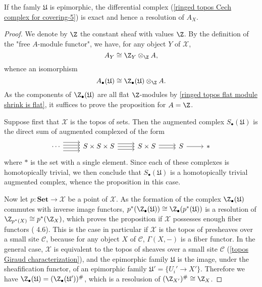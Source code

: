 \begin{proposition}\label{ringed topos Cech complex resolution for epimorphic}
If the famly $\mathfrak{U}$ is epimorphic, the differential complex (\ref{ringed topos Cech complex for covering-5}) is exact and hence a resolution of $A_X$.
\end{proposition}
\begin{proof}
We denote by $\Z$ the constant sheaf with values $\Z$. By the definition of the "free $A$-module functor", we have, for any object $Y$ of $\mathcal{X}$,
\[A_Y\cong\Z_Y\otimes_\Z A,\]
whence an isomorphism
\[A_\bullet(\mathfrak{U})\cong\Z_\bullet(\mathfrak{U})\otimes_\Z A.\]
As the components of $\Z_\bullet(\mathfrak{U})$ are all flat $\Z$-modules by \cref{ringed topos flat module shrink is flat}, it suffices to prove the proposition for $A=\Z$.\par
Suppose first that $\mathcal{X}$ is the topos of sets. Then the augmented complex $S_\bullet(\mathfrak{U})$ is the direct sum of augmented complexed of the form
\[\begin{tikzcd}
\cdots\ar[r,shift left=6pt]\ar[r,shift left=2pt]\ar[r,shift right=2pt]\ar[r,shift right=6pt]
&S\times S\times S\ar[r,shift left=4pt]\ar[r,shift right=4pt]\ar[r]
&S\times S\ar[r,shift left=2pt]\ar[r,shift right=2pt]
&S\ar[r]&\ast
\end{tikzcd}\]
where $\ast$ is the set with a single element. Since each of these complexes is homotopically trivial, we then conclude that $S_\bullet(\mathfrak{U})$ is a homotopically trivial augmented complex, whence the proposition in this case.\par
Now let $p:\mathbf{Set}\to \mathcal{X}$ be a point of $\mathcal{X}$. As the formation of the complex $\Z_\bullet(\mathfrak{U})$ commutes with inverse image functors, $p^*(\Z_\bullet(\mathfrak{U}))\cong\Z_\bullet(p^*(\mathfrak{U}))$ is a resolution of $\Z_{p^*(X)}\cong p^*(\Z_X)$, which proves the proposition if $\mathcal{X}$ possesses enough fiber functors (\cite{SGA4-1}  4.6). This is the case in particular if $\mathcal{X}$ is the topos of presheaves over a small site $\mathcal{C}$, because for any object $X$ of $\mathcal{C}$, $\Gamma(X,-)$ is a fiber functor. In the general case, $\mathcal{X}$ is equivalent to the topos of sheaves over a small site $\mathcal{C}$ (\cref{topos Giraud characterization}), and the epimorphic family $\mathfrak{U}$ is the image, under the sheafification functor, of an epimorphic family $\mathfrak{U}'=\{U_i'\to X'\}$. Therefore we have $\Z_\bullet(\mathfrak{U})=(\Z_\bullet(\mathfrak{U}'))^\#$, which is a resolusion of $(\Z_{X'})^\#\cong\Z_X$.
\end{proof}


